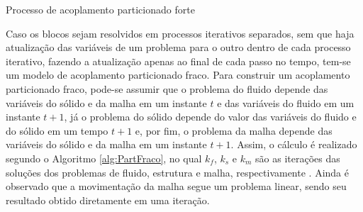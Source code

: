 \begin{algorithm}[h!]
    \caption{Processo de acoplamento particionado forte}
    \label{alg:acoplamentoForte}
\end{algorithm}

Caso os blocos sejam resolvidos em processos iterativos separados, sem que haja atualização das variáveis de um problema para o outro dentro de cada processo iterativo, fazendo a atualização apenas ao final de cada passo no tempo, tem-se um modelo de acoplamento particionado fraco. Para construir um acoplamento particionado fraco, pode-se assumir que o problema do fluido depende das variáveis do sólido e da malha em um instante $t$ e das variáveis do fluido em um instante $t+1$, já o problema do sólido depende do valor das variáveis do fluido e do sólido em um tempo $t+1$ e, por fim, o problema da malha depende das variáveis do sólido e da malha em um instante $t+1$. Assim, o cálculo é realizado segundo o Algoritmo \ref{alg:PartFraco}, no qual $k_f$, $k_s$ e $k_m$ são as iterações das soluções dos problemas de fluido, estrutura e malha, respectivamente \cite{sanches2022metodos}. Ainda é observado que a movimentação da malha segue um problema linear, sendo seu resultado obtido diretamente em uma iteração.

